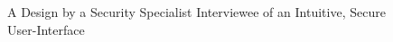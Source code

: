 \documentclass{tei2013}
\begin{document}
\begin{itemize}
\end{itemize}

\begin{figure}[ht]
\centering
{}
\caption{A Design by a Security Specialist Interviewee of an Intuitive, Secure User-Interface}
\label{fig:user1}
\end{figure}
\end{document}
